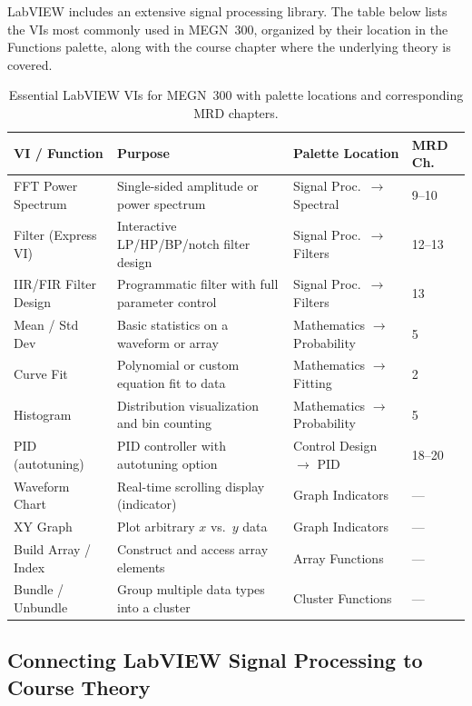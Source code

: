 LabVIEW includes an extensive signal processing library. The table below lists the VIs most commonly used in MEGN~300, organized by their location in the Functions palette, along with the course chapter where the underlying theory is covered.

\begin{table}[htbp]\centering\small
\begin{tabularx}{\textwidth}{l X l l}
\toprule
\textbf{VI / Function} & \textbf{Purpose} & \textbf{Palette Location} & \textbf{MRD Ch.} \\
\midrule
FFT Power Spectrum & Single-sided amplitude or power spectrum & Signal Proc.\ $\to$ Spectral & 9--10 \\
Filter (Express VI) & Interactive LP/HP/BP/notch filter design & Signal Proc.\ $\to$ Filters & 12--13 \\
IIR/FIR Filter Design & Programmatic filter with full parameter control & Signal Proc.\ $\to$ Filters & 13 \\
Mean / Std Dev & Basic statistics on a waveform or array & Mathematics $\to$ Probability & 5 \\
Curve Fit & Polynomial or custom equation fit to data & Mathematics $\to$ Fitting & 2 \\
Histogram & Distribution visualization and bin counting & Mathematics $\to$ Probability & 5 \\
PID (autotuning) & PID controller with autotuning option & Control Design $\to$ PID & 18--20 \\
Waveform Chart & Real-time scrolling display (indicator) & Graph Indicators & --- \\
XY Graph & Plot arbitrary $x$ vs.\ $y$ data & Graph Indicators & --- \\
Build Array / Index & Construct and access array elements & Array Functions & --- \\
Bundle / Unbundle & Group multiple data types into a cluster & Cluster Functions & --- \\
\bottomrule
\end{tabularx}
\caption{Essential LabVIEW VIs for MEGN~300 with palette locations and corresponding MRD chapters.}
\label{tab:lv_essential_vis}
\end{table}

\subsection{Connecting LabVIEW Signal Processing to Course Theory}

